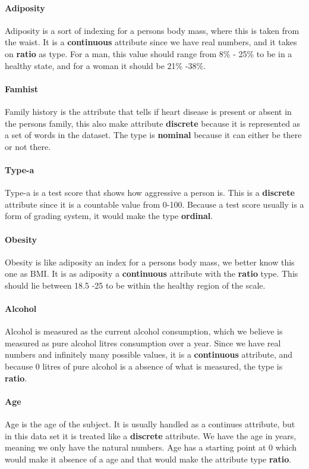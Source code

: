 \paragraph{Adiposity} Adiposity is a sort of indexing for a persons body mass, where this is taken from the waist. It is a \textbf{continuous} attribute since we have real numbers, and it takes on \textbf{ratio} as type. For a man, this value should range from 8\% - 25\% to be in a healthy state, and for a woman it should be 21\% -38\%.

\paragraph{Famhist} Family history is the attribute that tells if heart disease is present or absent in the persons family, this also make attribute \textbf{discrete} because it is represented as a set of words in the dataset. The type is \textbf{nominal} because it can either be there or not there.

\paragraph{Type-a} Type-a is a test score that shows how aggressive a person is. This is a \textbf{discrete} attribute since it is a countable value from 0-100. Because a test score usually is a form of grading system, it would make the type \textbf{ordinal}.

\paragraph{Obesity} Obesity is like adiposity an index for a persons body mass, we better know this one as BMI. It is as adiposity a \textbf{continuous} attribute with the \textbf{ratio} type. This should lie between 18.5 -25 to be within the healthy region of the scale.

\paragraph{Alcohol} Alcohol is measured as the current alcohol consumption, which we believe is measured as pure alcohol litres consumption over a year. Since we have real numbers and infinitely many possible values, it is a \textbf{continuous} attribute, and because 0 litres of pure alcohol is a absence of what is measured, the type is \textbf{ratio}.

\paragraph{Age} Age is the age of the subject. It is usually handled as a continues attribute, but in this data set it is treated like a \textbf{discrete} attribute. We have the age in years, meaning we only have the natural numbers. Age has a starting point at 0 which would make it absence of a age and that would make the attribute type \textbf{ratio}.

